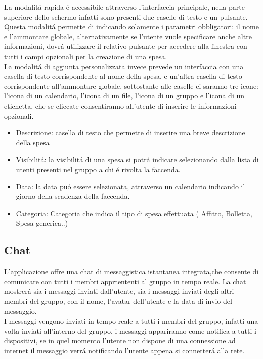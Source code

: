 La modalit\'a rapida \'e accessibile attraverso l'interfaccia principale, nella parte superiore dello schermo infatti sono presenti due caselle di testo e un pulsante.
Questa modalit\'a permette di indicando solamente i parametri obbligatori: il nome e l'ammontare globale, alternativamente se l'utente vuole specificare anche altre informazioni, dovr\'a utilizzare  il relativo pulsante per accedere alla finestra con tutti i campi opzionali per la creazione di una spesa.\\
La modalit\'a di aggiunta personalizzata invece prevede un interfaccia con una casella di testo corrispondente al nome della spesa, e un'altra casella di testo corrispondente all'ammontare globale, sottostante alle caselle ci saranno tre icone: l'icona di un calendario, l'icona di un file, l'icona di un gruppo e l'icona di un etichetta, che se cliccate consentiranno all'utente di inserire le informazioni opzionali.

\begin{itemize}
   \item Descrizione: casella di testo che permette di inserire una breve descrizione della spesa
   \item Visibilit\'a: la visibilit\'a di una spesa si potr\'a indicare selezionando dalla lista di utenti presenti nel gruppo a chi \'e rivolta la faccenda.
   \item Data: la data pu\'o essere selezionata, attraverso un calendario indicando il giorno della scadenza della faccenda.
    \item Categoria: Categoria che indica il tipo di spesa effettuata ( Affitto, Bolletta, Spesa generica..)
\end{itemize}




\subsection{Chat}
L'applicazione offre una chat di messaggistica istantanea integrata,che consente di comunicare con tutti i membri apprtententi al gruppo in tempo reale.
La chat mostrer\'a sia i messaggi inviati dall'utente, sia i messaggi inviati degli altri membri del gruppo, con il nome, l'avatar dell'utente e la data di invio del messaggio.\\
I messaggi vengono inviati in tempo reale a tutti i membri del gruppo, infatti una volta inviati all'interno del gruppo, i messaggi appariranno come notifica a tutti i dispositivi, se in quel momento l'utente non dispone di una connessione ad internet il messaggio verr\'a notificando  l'utente appena si connetter\'a alla rete.



